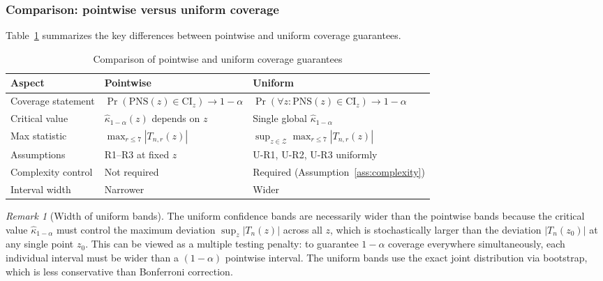 \documentclass[accepted]{uai2026} %
\theoremstyle{plain}
\theoremstyle{definition}
\theoremstyle{remark}
\newtheorem{remark}[theorem]{Remark}
\begin{document}
\subsubsection{Comparison: pointwise versus uniform coverage}
\label{subsubsec:comparison}

Table~\ref{tab:comparison} summarizes the key differences between pointwise
and uniform coverage guarantees.

\begin{table}[ht]
\centering
\caption{Comparison of pointwise and uniform coverage guarantees}
\label{tab:comparison}
\begin{tabular}{@{}lll@{}}
\toprule
\textbf{Aspect} & \textbf{Pointwise} & \textbf{Uniform} \\
\midrule
Coverage statement & 
  $\Pr(\mathrm{PNS}(z) \in \mathrm{CI}_z) \to 1-\alpha$ & 
  $\Pr(\forall z: \mathrm{PNS}(z) \in \mathrm{CI}_z) \to 1-\alpha$ \\
Critical value & 
  $\hat\kappa_{1-\alpha}(z)$ depends on $z$ & 
  Single global $\hat\kappa_{1-\alpha}$ \\
Max statistic &
  $\max_{r \le 7} |T_{n,r}(z)|$ &
  $\sup_{z \in \mathcal{Z}} \max_{r \le 7} |T_{n,r}(z)|$ \\
Assumptions & 
  R1--R3 at fixed $z$ & 
  U-R1, U-R2, U-R3 uniformly \\
Complexity control & 
  Not required & 
  Required (Assumption~\ref{ass:complexity}) \\
Interval width & 
  Narrower & 
  Wider \\
\bottomrule
\end{tabular}
\end{table}

\begin{remark}[Width of uniform bands]
The uniform confidence bands are necessarily wider than the pointwise bands
because the critical value $\hat\kappa_{1-\alpha}$ must control the maximum
deviation $\sup_z |T_n(z)|$ across all $z$, which is stochastically larger
than the deviation $|T_n(z_0)|$ at any single point $z_0$. This can be
viewed as a multiple testing penalty: to guarantee $1-\alpha$ coverage
everywhere simultaneously, each individual interval must be wider than a
$(1-\alpha)$ pointwise interval. The uniform bands use the exact joint
distribution via bootstrap, which is less conservative than Bonferroni
correction.
\end{remark}
\end{document}
